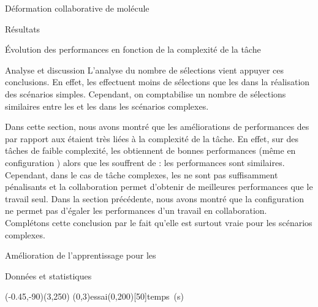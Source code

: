 \documentclass[myfrancais]{mythesis}
\begin{document}
\begin{mychapter}{Déformation collaborative de molécule}
\begin{mysection}{Résultats}
\begin{mysubsection}{Évolution des performances en fonction de la complexité de la tâche}
\begin{mysubsubsection}{Analyse et discussion}
					L'analyse du nombre de sélections vient appuyer ces conclusions.
					En effet, les  effectuent moins de sélections que les  dans la réalisation des scénarios simples.
					Cependant, on comptabilise un nombre de sélections similaires entre les  et les  dans les scénarios complexes.

					Dans cette section, nous avons montré que les améliorations de performances des  par rapport aux  étaient très liées à la complexité de la tâche.
					En effet, sur des tâches de faible complexité, les  obtiennent de bonnes performances (même en configuration ) alors que les  souffrent de  : les performances sont similaires.
					Cependant, dans le cas de tâche complexes, les  ne sont pas suffisamment pénalisants et la collaboration permet d'obtenir de meilleures performances que le travail seul.
					Dans la section précédente, nous avons montré que la configuration  ne permet pas d'égaler les performances d'un travail en collaboration.
					Complétons cette conclusion par le fait qu'elle est surtout vraie pour les scénarios complexes.
				\end{mysubsubsection}
			\end{mysubsection}
			\begin{mysubsection}{Amélioration de l'apprentissage pour les }
				\begin{mysubsubsection}{Données et statistiques}
					\begin{myfigure}
						\begin{myps}(-0.45,-90)(3,250)
							\myaxes(0,3){essai}(0,200)[50]{temps~(s)}
						\end{myps}
					\end{myfigure}


\end{mysubsubsection}
\end{mysubsection}
\end{mysection}
\end{mychapter}
\end{document}
